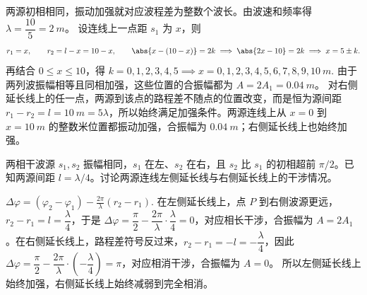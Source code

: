 \begin{solution}
两源初相相同，振动加强就对应波程差为整数个波长。由波速和频率得 \(\lambda=\dfrac{10}{5}=\SI{2}{m}\)。
设连线上一点距 \(s_1\) 为 \(x\)，则
\[
r_1=x,\qquad r_2=l-x=10-x,\qquad
\abs{x-(10-x)}=2k
\implies \abs{2x-10}=2k
\implies x=5\pm k.
\]
再结合 \(0\le x\le 10\)，得
 \(k=0,1,2,3,4,5 \implies x=0,1,2,3,4,5,6,7,8,9,10\ \si{m}.\) 
由于两列波振幅相等且同相加强，这些位置的合振幅都为 \(A=2A_1=\SI{0.04}{m}\)。
对右侧延长线上的任一点，两源到该点的路程差不随点的位置改变，而是恒为源间距 \(r_1-r_2=l=\SI{10}{m}=5\lambda\)，所以始终满足加强条件。两源连线上从 \(x=0\) 到 \(x=\SI{10}{m}\) 的整数米位置都振动加强，合振幅为 \(\SI{0.04}{m}\)；右侧延长线上也始终加强。
\end{solution}

\begin{exercise}[两相干波源有初相差时为什么左右延长线不一样]
两相干波源 \(s_1,s_2\) 振幅相同，\(s_1\) 在左、\(s_2\) 在右，且 \(s_2\) 比 \(s_1\) 的初相超前 \(\pi/2\)。已知两源间距 \(l=\lambda/4\)。讨论两源连线左侧延长线与右侧延长线上的干涉情况。
\end{exercise}
\begin{solution}
 \(\Delta\varphi=(\varphi_2-\varphi_1)-\frac{2\pi}{\lambda}(r_2-r_1).\) 
在左侧延长线上，点 \(P\) 到右侧波源更远，\(r_2-r_1=l=\dfrac{\lambda}{4}\)，于是 \(\Delta\varphi=\dfrac{\pi}{2}-\dfrac{2\pi}{\lambda}\cdot\dfrac{\lambda}{4}=0\)，对应相长干涉，合振幅为 \(A=2A_1\)。在右侧延长线上，路程差符号反过来，\(r_2-r_1=-l=-\dfrac{\lambda}{4}\)，因此 \(\Delta\varphi=\dfrac{\pi}{2}-\dfrac{2\pi}{\lambda}\cdot\left(-\dfrac{\lambda}{4}\right)=\pi\)，对应相消干涉，合振幅为 \(A=0\)。
所以左侧延长线上始终加强，右侧延长线上始终减弱到完全相消。
\end{solution}
